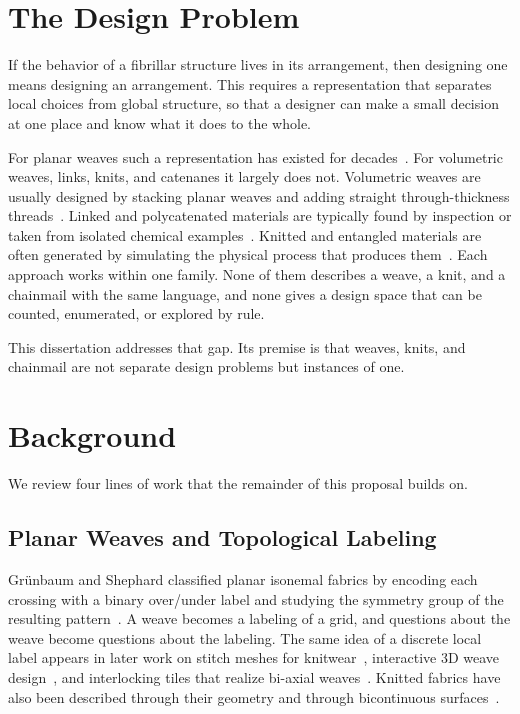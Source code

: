 \section{The Design Problem}
\label{sec:challenge}

If the behavior of a fibrillar structure lives in its arrangement, then designing one means designing an arrangement. This requires a representation that separates local choices from global structure, so that a designer can make a small decision at one place and know what it does to the whole.

For planar weaves such a representation has existed for decades~\cite{Grunbaum80}. For volumetric weaves, links, knits, and catenanes it largely does not. Volumetric weaves are usually designed by stacking planar weaves and adding straight through-thickness threads~\cite{STIG20121495}. Linked and polycatenated materials are typically found by inspection or taken from isolated chemical examples~\cite{zhou20253d}. Knitted and entangled materials are often generated by simulating the physical process that produces them~\cite{moestopo2023knots}. Each approach works within one family. None of them describes a weave, a knit, and a chainmail with the same language, and none gives a design space that can be counted, enumerated, or explored by rule.

This dissertation addresses that gap. Its premise is that weaves, knits, and chainmail are not separate design problems but instances of one.

\section{Background}
\label{sec:related-work}

We review four lines of work that the remainder of this proposal builds on.

\subsection{Planar Weaves and Topological Labeling}
Gr\"unbaum and Shephard classified planar isonemal fabrics by encoding each crossing with a binary over/under label and studying the symmetry group of the resulting pattern~\cite{Grunbaum80,Grunbaum85,Grunbaum86,grunbaum1988isonemal}. A weave becomes a labeling of a grid, and questions about the weave become questions about the labeling. The same idea of a discrete local label appears in later work on stitch meshes for knitwear~\cite{yuksel2012stitch}, interactive 3D weave design~\cite{wu2020weavecraft}, and interlocking tiles that realize bi-axial weaves~\cite{krishnamurthy2020bi,krishnamurthy2021geometrically}. Knitted fabrics have also been described through their geometry and through bicontinuous surfaces~\cite{knittel2020modelling,niu2025geometric}.

